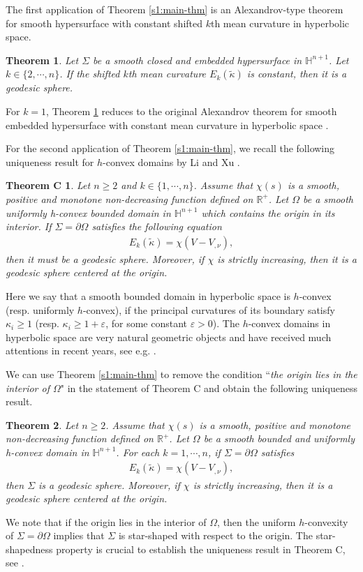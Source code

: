 \documentclass[11pt,reqno]{amsart}
\newtheorem{thm}{Theorem}[section]
\newtheorem*{thmC}{Theorem C}
\theoremstyle{definition}
\theoremstyle{remark}
\numberwithin{equation}{section}
\renewcommand{\(}{\left(}
\renewcommand{\)}{\right)}
\renewcommand{\~}{\widetilde}
\renewcommand{\-}{\overline}
\newcommand{\e}{\varepsilon}
\renewcommand{\k}{\kappa}
\begin{document}
The first application of Theorem \ref{s1:main-thm} is an Alexandrov-type theorem for smooth hypersurface with constant shifted $k$th mean curvature in hyperbolic space.
\begin{thm}\label{s1:thm-application-1}
	Let $\Sigma$ be a smooth closed and embedded hypersurface in $\mathbb{H}^{n+1}$. Let $k\in \{2,\cdots,n\}$. If the shifted $k$th mean curvature $E_k(\~{\k})$ is constant, then it is a geodesic sphere.
\end{thm}
For $k=1$, Theorem \ref{s1:thm-application-1} reduces to the original Alexandrov theorem for smooth embedded hypersurface with constant mean curvature in hyperbolic space \cite{Montiel-Ros1991}.

For the second application of Theorem \ref{s1:main-thm}, we recall the following uniqueness result for $h$-convex domains by Li and Xu \cite[Proposition 8.1]{Li-Xu2022}.
\begin{thmC}\cite{Li-Xu2022}
	Let $n\geq 2$ and $k\in\{1,\cdots, n\}$. Assume that $\chi(s)$ is a smooth, positive and monotone non-decreasing function defined on $\mathbb R^{+}$. Let $\Omega$ be a smooth uniformly h-convex bounded domain in $\mathbb H^{n+1}$ which contains the origin in its interior. If $\Sigma=\partial\Omega$ satisfies the following equation
	\begin{align*}
	E_k(\~\k)=\chi(V-V_{,\nu}),
	\end{align*}
then it must be a geodesic sphere. Moreover, if $\chi$ is strictly increasing, then it is a geodesic sphere centered at the origin.
\end{thmC}

Here we say that a smooth bounded domain in hyperbolic space is $h$-convex (resp. uniformly $h$-convex), if the principal curvatures of its boundary satisfy $\k_i\geq 1$ (resp. $\k_i\geq 1+\e$, for some constant $\e>0$). The $h$-convex domains in hyperbolic space are very natural geometric objects and have received much attentions in recent years, see e.g. \cite{BM99,CabezasRivas-Miquel2007,Wang-Xia2014,AW2018,ACW2021,Wang-Wei-Zhou2022,HL22,HLW20}.

We can use Theorem \ref{s1:main-thm} to remove the condition ``\textit{the origin lies in the interior of $\Omega$}" in the statement of Theorem C and obtain the following uniqueness result.
\begin{thm}\label{s1:thm-application-2}
	Let $n\geq 2$. Assume that $\chi(s)$ is a smooth, positive and monotone non-decreasing function defined on $\mathbb R^{+}$.  Let $\Omega$ be a smooth bounded and uniformly h-convex domain in $\mathbb{H}^{n+1}$. For each $k=1,\cdots,n$, if $\Sigma=\partial \Omega$ satisfies
	\begin{align}\label{s1.cond}
	E_k(\~\k)=\chi(V-V_{,\nu}),
	\end{align}
then $\Sigma$ is a geodesic sphere. Moreover, if $\chi$ is strictly increasing, then it is a geodesic sphere centered at the origin.
\end{thm}
We note that if the origin lies in the interior of $\Omega$, then the uniform $h$-convexity of $\Sigma=\partial\Omega$ implies that $\Sigma$ is star-shaped with respect to the origin. The star-shapedness property is crucial to establish the uniqueness result in Theorem C, see \cite[p.97]{Li-Xu2022}.
\end{document}
